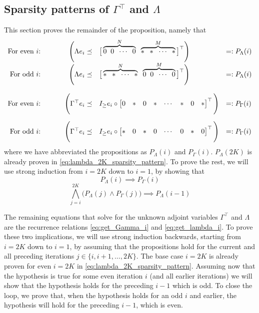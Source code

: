 \documentclass[a4paper,12pt]{article}
\theoremstyle{definition}
\begin{document}
\subsection{Sparsity patterns of $\Gamma^\top$ and $\Lambda$}\label{subsec:sparsity_Gamma_Lambda}
This section proves the remainder of the proposition, namely that
$$\begin{array}{rrll}
    \text{For even $i$: }& \quad\quad \Bigg(\Lambda e_i \preceq& \big[\overbrace{0 \;\; 0 \;\; \cdots \;\; 0}^{N} \;\; \overbrace{* \;\; * \;\; \cdots \;\; *}^{M}\big] ^\top\Bigg) & =: P_\Lambda(i)
    \\
    \text{For odd $i$: }& \quad\quad \Bigg(\Lambda e_i \preceq& \big[\overbrace{* \;\; * \;\; \cdots \;\; *}^{N} \; \;\overbrace{0 \;\; 0 \;\; \cdots \;\; 0}^{M}\big]^\top \Bigg) & =: P_\Lambda(i)
    \\
    \\
    \text{For even $i$: }& \quad\quad \Bigg(\Gamma^\top e_i \preceq& I_{\geq}e_i \circ \begin{bmatrix} 0 & * & 0 & * & \cdots & * & 0 & *\end{bmatrix} ^\top\Bigg) & =: P_\Gamma(i)\vspace{10px}
    \\
    \text{For odd $i$: }&  \quad \quad \Bigg(\Gamma^\top e_i \preceq& I_{\geq}e_i \circ \begin{bmatrix} * & 0 & * & 0 &  \cdots & 0 & * & 0\end{bmatrix} ^\top\Bigg) & =: P_\Gamma(i)
\end{array}$$
where we have abbreviated the propositions as $P_\Lambda(i)$ and $P_\Gamma(i)$. 
$P_\Lambda(2K)$ is already proven in \eqref{eq:lambda_2K_sparsity_pattern}.
To prove the rest, we will use strong induction from $i = 2K$ down to $i=1$, by showing that
$$P_\Lambda(i) \!\!\implies P_\Gamma(i)$$
$$\bigwedge_{j=i}^{2K} \big(P_\Lambda(j) \wedge P_\Gamma(j) \big) \!\!\implies P_\Lambda(i-1)$$

The remaining equations that solve for the unknown adjoint variables $\Gamma^\top$ and $\Lambda$ are the recurrence relations \eqref{eq:get_Gamma_i} and \eqref{eq:get_lambda_i}.
To prove these two implications, we will use strong induction backwards, starting from $i=2K$ down to $i=1$, by assuming that the propositions hold for the current and all preceding iterations $j \in \{i, i+1, \dots, 2K\}$. The base case $i = 2K$ is already proven for even $i=2K$ in \eqref{eq:lambda_2K_sparsity_pattern}. Assuming now that the hypothesis is true for some even iteration $i$ (and all earlier iterations) we will show that the hypothesis holds for the preceding $i-1$ which is odd. To close the loop, we prove that, when the hypothesis holds for an odd $i$ and earlier, the hypothesis will hold for the preceding $i-1$, which is even.
\\
\end{document}
